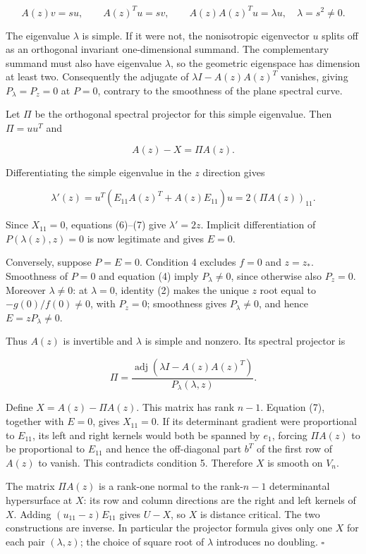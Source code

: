 \documentclass[10pt,a4paper]{article}
\begin{document}
\nopagebreak[4]

\[A(z)v=su,\qquad A(z)^Tu=sv,\qquad
A(z)A(z)^Tu=\lambda u,\quad \lambda=s^2\ne0.\tag{5}\]

The eigenvalue \(\lambda\) is simple. If it were not, the nonisotropic
eigenvector \(u\) splits off as an orthogonal invariant one-dimensional
summand. The complementary summand must also have eigenvalue
\(\lambda\), so the geometric eigenspace has dimension at least two.
Consequently the adjugate of \(\lambda I-A(z)A(z)^T\) vanishes, giving
\(P_\lambda=P_z=0\) at \(P=0\), contrary to the smoothness of the plane
spectral curve.

Let \(\Pi\) be the orthogonal spectral projector for this simple
eigenvalue. Then \(\Pi=uu^T\) and

\nopagebreak[4]

\[A(z)-X=\Pi A(z).\tag{6}\]

Differentiating the simple eigenvalue in the \(z\) direction gives

\nopagebreak[4]

\[\lambda'(z)=u^T(E_{11}A(z)^T+A(z)E_{11})u
=2(\Pi A(z))_{11}.\tag{7}\]

Since \(X_{11}=0\), equations (6)--(7) give \(\lambda'=2z\). Implicit
differentiation of \(P(\lambda(z),z)=0\) is now legitimate and gives
\(E=0\).

Conversely, suppose \(P=E=0\). Condition 4 excludes \(f=0\) and
\(z=z_*\). Smoothness of \(P=0\) and equation (4) imply
\(P_\lambda\ne0\), since otherwise also \(P_z=0\). Moreover
\(\lambda\ne0\): at \(\lambda=0\), identity (2) makes the unique \(z\)
root equal to \(-g(0)/f(0)\ne0\), with \(P_z=0\); smoothness gives
\(P_\lambda\ne0\), and hence \(E=zP_\lambda\ne0\).

Thus \(A(z)\) is invertible and \(\lambda\) is simple and nonzero. Its
spectral projector is

\nopagebreak[4]

\[\Pi=\frac{\operatorname{adj}(\lambda I-A(z)A(z)^T)}{P_\lambda(\lambda,z)}.\]

Define \(X=A(z)-\Pi A(z)\). This matrix has rank \(n-1\). Equation (7),
together with \(E=0\), gives \(X_{11}=0\). If its determinant gradient
were proportional to \(E_{11}\), its left and right kernels would both
be spanned by \(e_1\), forcing \(\Pi A(z)\) to be proportional to
\(E_{11}\) and hence the off-diagonal part \(b^T\) of the first row of
\(A(z)\) to vanish. This contradicts condition 5. Therefore \(X\) is
smooth on \(V_n\).

The matrix \(\Pi A(z)\) is a rank-one normal to the rank-\(n-1\)
determinantal hypersurface at \(X\): its row and column directions are
the right and left kernels of \(X\). Adding \((u_{11}-z)E_{11}\) gives
\(U-X\), so \(X\) is distance critical. The two constructions are
inverse. In particular the projector formula gives only one \(X\) for
each pair \((\lambda,z)\); the choice of square root of \(\lambda\)
introduces no doubling. \(\square\)
\end{document}
